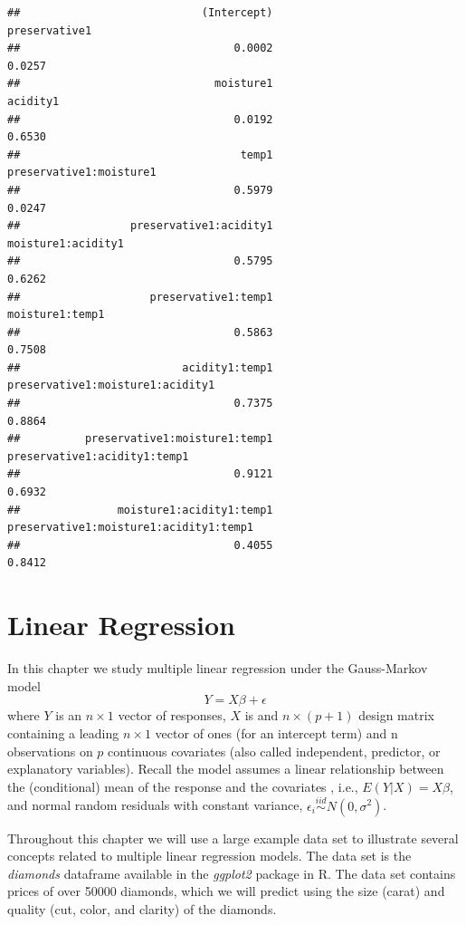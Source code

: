 \documentclass[
]{book}
\begin{document}
\begin{verbatim}
##                            (Intercept)                          preservative1 
##                                 0.0002                                 0.0257 
##                              moisture1                               acidity1 
##                                 0.0192                                 0.6530 
##                                  temp1                preservative1:moisture1 
##                                 0.5979                                 0.0247 
##                 preservative1:acidity1                     moisture1:acidity1 
##                                 0.5795                                 0.6262 
##                    preservative1:temp1                        moisture1:temp1 
##                                 0.5863                                 0.7508 
##                         acidity1:temp1       preservative1:moisture1:acidity1 
##                                 0.7375                                 0.8864 
##          preservative1:moisture1:temp1           preservative1:acidity1:temp1 
##                                 0.9121                                 0.6932 
##               moisture1:acidity1:temp1 preservative1:moisture1:acidity1:temp1 
##                                 0.4055                                 0.8412
\end{verbatim}

\hypertarget{linear-regression}{%
\chapter{Linear Regression}\label{linear-regression}}

In this chapter we study multiple linear regression under the Gauss-Markov model
\[Y = X\beta + \epsilon\]
where \(Y\) is an \(n\times 1\) vector of responses, \(X\) is and \(n\times(p+1)\) design matrix containing a leading \(n\times 1\) vector of ones (for an intercept term) and n observations on \(p\) continuous covariates (also called independent, predictor, or explanatory variables). Recall the model assumes a linear relationship between the (conditional) mean of the response and the covariates , i.e., \(E(Y|X) = X\beta\), and normal random residuals with constant variance, \(\epsilon_i \stackrel{iid}{\sim} N(0, \sigma^2)\).

Throughout this chapter we will use a large example data set to illustrate several concepts related to multiple linear regression models. The data set is the \emph{diamonds} dataframe available in the \emph{ggplot2} package in R. The data set contains prices of over 50000 diamonds, which we will predict using the size (carat) and quality (cut, color, and clarity) of the diamonds.
\end{document}
